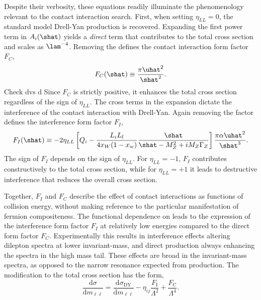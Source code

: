 Despite their verbosity, these equations readily illuminate the phenomenology relevant to the contact interaction search.
First, when setting $\eta_{LL}=0$, the standard model Drell-Yan production is recovered.
Expanding the first power term in $A_i(\shat)$ yields a \emph{direct} term that contributes to the total cross section and scales as $\lam^{-4}$.
Removing the \lam defines the contact interaction form factor $F_C$,
\begin{equation}\begin{split}
    F_C(\shat) \equiv \frac{\pi\uhat^2}{\shat^2}.
\end{split}\end{equation} 
{\color{red} Check d\that vs d\mll}
Since $F_C$ is strictly positive, it enhances the total \qqll cross section regardless of the sign of $\eta_{LL}$.
The cross terms in the expansion dictate the interference of the contact interaction with Drell-Yan.
Again removing the \lam factor defines the interference form factor $F_I$,
\begin{equation}\begin{split}
    F_I(\shat) \equiv -2\eta_{LL}\left[Q_i-\frac{L_iL_l}{4x_W(1-x_w)}\frac{\shat}{\shat-M_Z^2+iM_Z\Gamma_Z}\right]\frac{\pi\alpha\uhat^2}{\shat^3}.
\end{split}\end{equation} 
The sign of $F_I$ depends on the sign of $\eta_{LL}$.
For $\eta_{LL}=-1$, $F_I$ contributes constructively to the total cross section, while for $\eta_{LL}=+1$ it leads to destructive interference that reduces the overall cross section.

Together, $F_I$ and $F_C$ describe the effect of contact interactions as functions of collision energy, without making reference to the particular manifestation of fermion compositeness.
The functional dependence on \shat leads to the expression of the interference form factor $F_I$ at relatively low energies compared to the direct form factor $F_C$.
Experimentally this results in interference effects altering dilepton spectra at lower invariant-mass, and direct production always enhancing the spectra in the high mass tail.
These effects are broad in the invariant-mass spectra, as opposed to the narrow resonance expected from \hmm production.
The modification to the total cross section has the form,
\begin{equation}\label{eqn:cixsPheno}
\frac{\text{d}\sigma}{\text{d}m_{\ell\ell}} = \frac{\text{d}\sigma_\textrm{DY}}{\text{d}m_{\ell\ell}} - \eta_{ij}\frac{F_\textrm{I}}{\Lambda^2} + \frac{F_\textrm{C}}{\Lambda^4}.
\end{equation}

